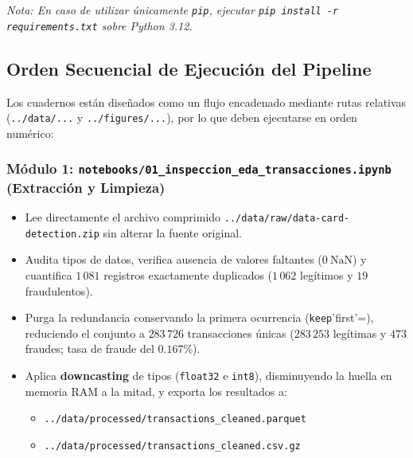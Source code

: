 \documentclass[11pt]{article}
\begin{document}
\emph{Nota: En caso de utilizar únicamente \texttt{pip}, ejecutar \texttt{pip install -r requirements.txt} sobre Python 3.12.}

\subsection{Orden Secuencial de Ejecución del Pipeline}
\label{sec:orgb484ebb}

Los cuadernos están diseñados como un flujo encadenado mediante rutas relativas (\texttt{../data/...} y \texttt{../figures/...}), por lo que deben ejecutarse en orden numérico:

\subsubsection{Módulo 1: \texttt{notebooks/01\_inspeccion\_eda\_transacciones.ipynb} (Extracción y Limpieza)}
\label{sec:org8d04e05}
\begin{itemize}
\item Lee directamente el archivo comprimido \texttt{../data/raw/data-card-detection.zip} sin alterar la fuente original.
\item Audita tipos de datos, verifica ausencia de valores faltantes (\(0\ \text{NaN}\)) y cuantifica \(1\,081\) registros exactamente duplicados (\(1\,062\) legítimos y \(19\) fraudulentos).
\item Purga la redundancia conservando la primera ocurrencia (\texttt{keep}'first'=), reduciendo el conjunto a \(283\,726\) transacciones únicas (\(283\,253\) legítimas y \(473\) fraudes; tasa de fraude del \(0.167\%\)).
\item Aplica \textbf{downcasting} de tipos (\texttt{float32} e \texttt{int8}), disminuyendo la huella en memoria RAM a la mitad, y exporta los resultados a:
\begin{itemize}
\item \texttt{../data/processed/transactions\_cleaned.parquet}
\item \texttt{../data/processed/transactions\_cleaned.csv.gz}
\end{itemize}
\end{itemize}
\end{document}
